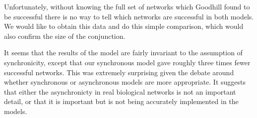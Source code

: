 \documentclass[a4paper,11pt]{article}
\begin{document}

Unfortunately, without knowing the full set of networks which Goodhill found to be successful there is no way to tell which networks are successful in both models. We would like to obtain this data and do this simple comparison, which would also confirm the size of the conjunction.
\par

It seems that the results of the model are fairly invariant to the assumption of synchronicity, except that our synchronous model gave roughly three times fewer successful networks. This was extremely surprising given the debate around whether synchronous or asynchronous models are more appropriate. It suggests that either the asynchronicty in real biological networks is not an important detail, or that it is important but is not being accurately implemented in the models.
\par 
\end{document}
